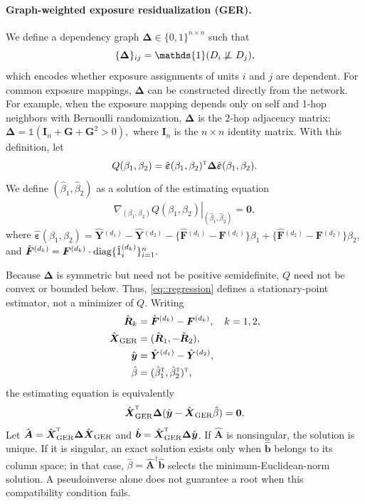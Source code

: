 \documentclass[twoside,letterpaper]{article}
\newcommand{\mathbbm}[1]{\mathds{#1}}
\theoremstyle{plain}
\theoremstyle{definition}
\theoremstyle{remark}
\def\T{{\textsc{t}}}
\newcommand{\bY}{\boldsymbol{Y}}
\newcommand{\bA}{\boldsymbol{A}}
\newcommand{\bG}{\boldsymbol{G}}
\newcommand{\bX}{\boldsymbol{X}}
\newcommand{\bF}{\boldsymbol{F}}
\newcommand{\bI}{\boldsymbol{I}}
\newcommand{\bDelta}{\boldsymbol{\Delta}}
\newcommand{\bepsilon}{\boldsymbol{\varepsilon}}
\newcommand{\indicator}{\mathbbm{1}}
\newcommand{\bZero}{\boldsymbol{0}}
\begin{document}
\paragraph{Graph-weighted exposure residualization (GER).}
We define a dependency graph $\bDelta \in \{0,1\}^{n \times n}$ such that
\[
\{\bDelta\}_{ij} = \indicator(D_i \not\!\perp\!\!\!\perp D_j),
\]
which encodes whether exposure assignments of units $i$ and $j$ are dependent.  For common exposure mappings, $\bDelta$ can be constructed directly from the network. For example, when the exposure
mapping depends only on self and 1-hop neighbors with Bernoulli randomization, $\bDelta$ is the $2$-hop adjacency matrix:
$\bDelta = \indicator(\bI_n + \bG + \bG^2 > 0),$
where $\bI_n$ is the $n\times n$ identity matrix. 
With this definition, let
\[
Q(\beta_1,\beta_2)
= \hat{\bepsilon}(\beta_1,\beta_2)^{\T}
  \bDelta\hat{\bepsilon}(\beta_1,\beta_2).
\]
We define $(\hat{\beta}_1,\hat{\beta}_2)$ as a solution of the estimating equation
\begin{align}\label{eq::regression}
\left.\nabla_{(\beta_1,\beta_2)}Q(\beta_1,\beta_2)
\right|_{(\hat{\beta}_1,\hat{\beta}_2)} = \bZero,
\end{align}
where
$ \hat{\bepsilon}(\beta_1, \beta_2) = 
    \hat{\bY}{}^{(d_1)} - \hat{\bY}{}^{(d_2)} 
    - \{\hat{\bF}{}^{(d_1)} - \bF{}^{(d_1)}\} \beta_1 + \{\hat{\bF}{}^{(d_2)} - \bF{}^{(d_2)}\} \beta_2,$
and $\hat{\bF}{}^{(d_k)} = \bF{}^{(d_k)} \cdot \textup{diag}\{\hat 1{}_i^{(d_k)}\}_{i=1}^n.$ 


Because $\bDelta$ is symmetric but need not be positive semidefinite, $Q$ need not be convex or bounded below. Thus, \eqref{eq::regression} defines a stationary-point estimator, not a minimizer of $Q$. Writing
\begin{align*}
\hat{\boldsymbol{R}}_k &= \hat{\bF}{}^{(d_k)}-\bF{}^{(d_k)},\quad k=1,2,\\
\hat{\bX}_{\mathrm{GER}} &= (\hat{\boldsymbol{R}}_1,-\hat{\boldsymbol{R}}_2),\\
\hat{\boldsymbol{y}} &= \hat{\bY}{}^{(d_1)}-\hat{\bY}{}^{(d_2)},\\
\hat\beta &= (\hat\beta_1^{\T},\hat\beta_2^{\T})^{\T},
\end{align*}
the estimating equation is equivalently
\[
\hat{\bX}_{\mathrm{GER}}^{\T}\bDelta
(\hat{\boldsymbol{y}}-\hat{\bX}_{\mathrm{GER}}\hat\beta)=\bZero.
\]
Let $\hat{\bA}=\hat{\bX}_{\mathrm{GER}}^{\T}\bDelta\hat{\bX}_{\mathrm{GER}}$ and $\hat{\boldsymbol{b}}=\hat{\bX}_{\mathrm{GER}}^{\T}\bDelta\hat{\boldsymbol{y}}$. If $\hat{\bA}$ is nonsingular, the solution is unique. If it is singular, an exact solution exists only when $\hat{\boldsymbol{b}}$ belongs to its column space; in that case, $\hat\beta=\hat{\bA}^{\dagger}\hat{\boldsymbol{b}}$ selects the minimum-Euclidean-norm solution. A pseudoinverse alone does not guarantee a root when this compatibility condition fails.
\end{document}
